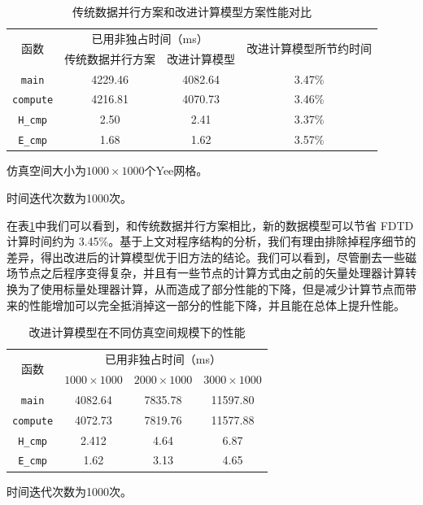 \begin{table}[hp]
\centering
\caption{传统数据并行方案和改进计算模型方案性能对比}\label{ch3: tradition or new}
\begin{threeparttable}
	\begin{tabular}{cccc}
		\toprule
		\multirow{2}{2em}{函数}&\multicolumn{2}{c}{已用非独占时间（ms）} & \multirow{2}{11em}{改进计算模型所节约时间}\\ 
		\cline{2-3}
		& 传统数据并行方案 & 改进计算模型 & \\ 
		
		\midrule
		\lstinline|main| & 4229.46 & 4082.64 & 3.47\% \\ 
		\lstinline|compute| & 4216.81 & 4070.73 & 3.46\%\\ 
		\lstinline|H_cmp|& 2.50 & 2.41 & 3.37\%\\ 
		\lstinline|E_cmp|& 1.68 & 1.62 & 3.57\% \\
		\bottomrule
	\end{tabular}
	\begin{tablenotes}
		\item[1] 仿真空间大小为$1000\times1000$个Yee网格。
		\item[2] 时间迭代次数为1000次。
	\end{tablenotes}
\end{threeparttable}
\end{table}

在表\ref{ch3: tradition or new}中我们可以看到，和传统数据并行方案相比，新的数据模型可以节省 FDTD 计算时间约为 3.45\%。基于上文对程序结构的分析，我们有理由排除掉程序细节的差异，得出改进后的计算模型优于旧方法的结论。我们可以看到，尽管删去一些磁场节点之后程序变得复杂，并且有一些节点的计算方式由之前的矢量处理器计算转换为了使用标量处理器计算，从而造成了部分性能的下降，但是减少计算节点而带来的性能增加可以完全抵消掉这一部分的性能下降，并且能在总体上提升性能。

\begin{table}[hp]
	\centering
	\begin{threeparttable}
	\caption{改进计算模型在不同仿真空间规模下的性能}\label{ch3: new, size}
		\begin{tabular}{cccc}
			\toprule
			\multirow{2}{2em}{函数}&\multicolumn{3}{c}{已用非独占时间（ms）}\\ 
			\cline{2-4}
			& $1000\times1000$ & $2000\times1000$ & $3000\times1000$\\ 
			
			\midrule
			\lstinline|main| & 4082.64 & 7835.78 & 11597.80 \\ 
			\lstinline|compute| & 4072.73 & 7819.76 & 11577.88\\ 
			\lstinline|H_cmp|& 2.412 & 4.64 & 6.87\\ 
			\lstinline|E_cmp|& 1.62 & 3.13 & 4.65 \\
			\bottomrule
		\end{tabular}
		\begin{tablenotes}
			\item[1] 时间迭代次数为1000次。
		\end{tablenotes}
	\end{threeparttable}
\end{table}

